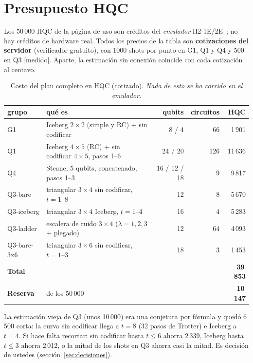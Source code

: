 \documentclass[11pt,a4paper]{article}
\begin{document}
\section{Presupuesto HQC}\label{sec:presupuesto}

Los 50\,000 HQC de la p\'agina de uso son cr\'editos del \emph{emulador} H2-1E/2E~\cite{quantinuumemul}; no hay cr\'editos de hardware
real. Todos los precios de la tabla son \textbf{cotizaciones del servidor} (verificador gratuito), con 1000
shots por punto en G1, Q1 y Q4 y 500 en Q3 [medido]. Aparte, la estimaci\'on sin conexi\'on coincide con cada
cotizaci\'on al centavo.

\begin{table}[h]\centering\small
\caption{Costo del plan completo en HQC (cotizado). \emph{Nada de esto se ha corrido en el emulador.}}
\begin{tabular}{llrrr}
\toprule
grupo & qu\'e es & qubits & circuitos & HQC\\
\midrule
G1 & Iceberg $2{\times}2$ (simple y RC) + sin codificar & 8 / 4 & 66 & 1\,901\\
Q1 & Iceberg $4{\times}5$ (RC) + sin codificar $4{\times}5$, pasos 1--6 & 24 / 20 & 126 & 11\,636\\
Q4 & Steane, 5 qubits, concatenado, pasos 1--3 & 16 / 12 / 18 & 9 & 9\,817\\
Q3-bare & triangular $3{\times}4$ sin codificar, $t=1$--8 & 12 & 8 & 5\,670\\
Q3-iceberg & triangular $3{\times}4$ Iceberg, $t=1$--4 & 16 & 4 & 5\,283\\
Q3-ladder & escalera de ruido $3{\times}4$ ($\lambda=1,2,3$ + plegado) & 12 & 64 & 4\,093\\
Q3-bare-3x6 & triangular $3{\times}6$ sin codificar, $t=1$--3 & 18 & 3 & 1\,453\\
\midrule
\textbf{Total} & & & & \textbf{39\,853}\\
\textbf{Reserva} & de los 50\,000 & & & \textbf{10\,147}\\
\bottomrule
\end{tabular}
\end{table}

La estimaci\'on vieja de Q3 (unos 10\,000) era una conjetura por f\'ormula y qued\'o 6\,500 corta: la curva sin
codificar llega a $t=8$ (32 pasos de Trotter) e Iceberg a $t=4$. Si hace falta recortar: sin codificar
hasta $t\le6$ ahorra 2\,339, Iceberg hasta $t\le3$ ahorra 2\,012, o la mitad de los shots en Q3 ahorra casi la
mitad. Es decisi\'on de ustedes (secci\'on~\ref{sec:decisiones}).
\end{document}
